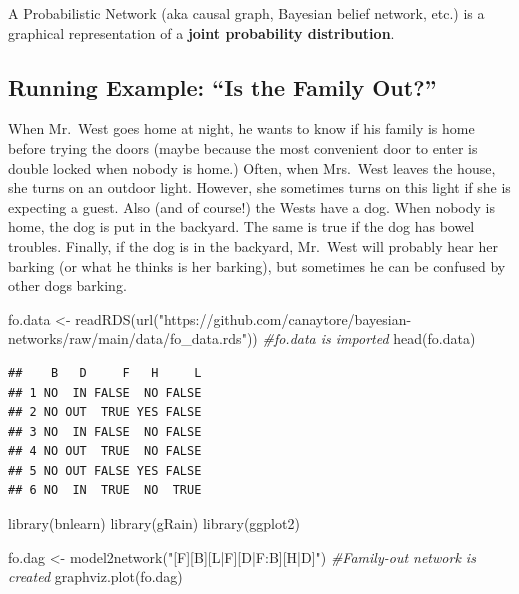 \documentclass[
]{article}
\newenvironment{Shaded}{\begin{snugshade}}{\end{snugshade}}
\newcommand{\CommentTok}[1]{\textcolor[rgb]{0.56,0.35,0.01}{\textit{#1}}}
\newcommand{\FunctionTok}[1]{\textcolor[rgb]{0.00,0.00,0.00}{#1}}
\newcommand{\NormalTok}[1]{#1}
\newcommand{\OtherTok}[1]{\textcolor[rgb]{0.56,0.35,0.01}{#1}}
\newcommand{\StringTok}[1]{\textcolor[rgb]{0.31,0.60,0.02}{#1}}
\begin{document}
A Probabilistic Network (aka causal graph, Bayesian belief network, etc.) is a graphical representation of a \textbf{joint probability distribution}.

\hypertarget{running-example-is-the-family-out}{%
\subsection{Running Example: ``Is the Family Out?''}\label{running-example-is-the-family-out}}

When Mr.~West goes home at night, he wants to know if his family is home before trying the doors (maybe because the most convenient door to enter is double locked when nobody is home.) Often, when Mrs.~West leaves the house, she turns on an outdoor light. However, she sometimes turns on this light if she is expecting a guest. Also (and of course!) the Wests have a dog. When nobody is home, the dog is put in the backyard. The same is true if the dog has bowel troubles. Finally, if the dog is in the backyard, Mr.~West will probably hear her barking (or what he thinks is her barking), but sometimes he can be confused by other dogs barking.

\begin{Shaded}
\begin{Highlighting}[]
\NormalTok{fo.data }\OtherTok{\textless{}{-}} \FunctionTok{readRDS}\NormalTok{(}\FunctionTok{url}\NormalTok{(}\StringTok{"https://github.com/canaytore/bayesian{-}networks/raw/main/data/fo\_data.rds"}\NormalTok{)) }\CommentTok{\#fo.data is imported}
\FunctionTok{head}\NormalTok{(fo.data)}
\end{Highlighting}
\end{Shaded}

\begin{verbatim}
##    B   D     F   H     L
## 1 NO  IN FALSE  NO FALSE
## 2 NO OUT  TRUE YES FALSE
## 3 NO  IN FALSE  NO FALSE
## 4 NO OUT  TRUE  NO FALSE
## 5 NO OUT FALSE YES FALSE
## 6 NO  IN  TRUE  NO  TRUE
\end{verbatim}

\begin{Shaded}
\begin{Highlighting}[]
\FunctionTok{library}\NormalTok{(bnlearn)}
\FunctionTok{library}\NormalTok{(gRain)}
\FunctionTok{library}\NormalTok{(ggplot2)}

\NormalTok{fo.dag }\OtherTok{\textless{}{-}} \FunctionTok{model2network}\NormalTok{(}\StringTok{"[F][B][L|F][D|F:B][H|D]"}\NormalTok{) }\CommentTok{\#Family{-}out network is created}
\FunctionTok{graphviz.plot}\NormalTok{(fo.dag)}
\end{Highlighting}
\end{Shaded}
\end{document}
